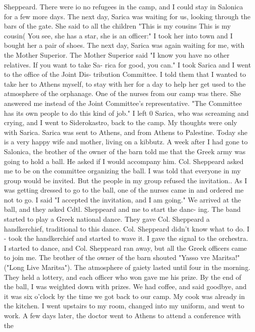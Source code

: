 Sheppeard.
There were io no refugees in the camp, and I could stay in Salonica for a few more days.
The next day, Sarica was waiting for us, looking through the bars of the gate.
She 
said to all the children "This is my cousins This is my cousin( You see, she has a 
star, she is an officer:" I took her into town and I bought her a pair of shoes.
The next day, Sarica was again waiting for me, with the Mother Superior.
The 
Mother Superior said "I know you have no other relatives.
If you want to take Sa-
rica for good, you can."
I took Sarica and I went to the office of the Joint Dis-
tribution Committee.
I told them that I wanted to take her to Athens myself, to stay 
with her for a day to help her get used to the atmosphere of the orphanage.
One of 
the nurses from our camp was there.
She answered me instead of the Joint Committee's 
representative.
"The Committee has its own people to do this kind of job."
I left 
0 
Sarica, who was screaming and crying, and I went to Siderokastro, back to the camp.
My thoughts were only with Sarica.
Sarica was sent to Athens, and from Athens to 
Palestine.
Today she is a very happy wife and mother, living on a kibbutz.
A week after I had gone to Salonica, the brother of the owner of the barn told 
me that the Greek army was going to hold a ball.
He asked if I would accompany him.
Col.
Sheppeard asked me to be on the committee organizing the ball.
I was told 
that everyone in my group would be invited.
But the people in my group refused the 
invitation.. As I was getting dressed to go to the ball, one of the nurses came in 
and ordered me not to go.
I said "I accepted the invitation, and I am going."
We arrived at the ball, and they asked Cdtl.
Sheppeard and me to start the danc-
ing.
The band started to play a Greek national dance.
They gave Col.
Sheppeard a 
handkerchief, traditional to this dance.
Col.
Sheppeard didn't know what to do.
I - 
took the handkerchief and started to wave it.
I gave the signal to the orchestra.
I started to dance, and Col.
Sheppeard ran away, but all the Greek officers came to 
join me.
The brother of the owner of the barn shouted "Yasso vre Maritsa!"
("Long 
Live Maritsa").
The atmosphere of gaiety lasted until four in the morning.
They 
held a lottery, and each officer who won gave me his prize.
By the end of the ball, 
I was weighted down with prizes.
We had coffee, and said goodbye, and it was six 
o'clock by the time we got back to our camp.
My cook was already in the kitchen.
I went upstairs to my room, changed into my uniform, and went to work.
A few days later, the doctor went to Athens to attend a conference with the 
